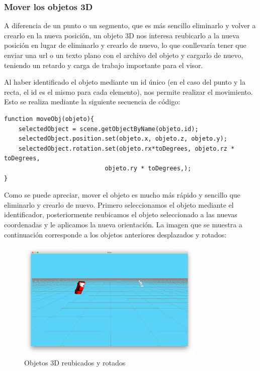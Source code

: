 \subsubsection{Mover los objetos 3D}
A diferencia de un punto o un segmento, que es más sencillo eliminarlo y volver a crearlo en la nueva posición, un objeto 3D nos interesa reubicarlo a la nueva posición en lugar de eliminarlo y crearlo de nuevo, lo que conllevaría tener que enviar una url o un texto plano con el archivo del objeto y cargarlo de nuevo, teniendo un retardo y carga de trabajo importante para el visor.

Al haber identificado el objeto mediante un id único (en el caso del punto y la recta, el id es el mismo para cada elemento), nos permite realizar el movimiento. Esto se realiza mediante la siguiente secuencia de código:
\begin{lstlisting}[frame=single]
function moveObj(objeto){
	selectedObject = scene.getObjectByName(objeto.id);
	selectedObject.position.set(objeto.x, objeto.z, objeto.y);
	selectedObject.rotation.set(objeto.rx*toDegrees, objeto.rz * toDegrees, 
							objeto.ry * toDegrees,);
}
\end{lstlisting}
Como se puede apreciar, mover el objeto es mucho más rápido y sencillo que eliminarlo y crearlo de nuevo. Primero seleccionamos el objeto mediante el identificador, posteriormente reubicamos el objeto seleccionado a las nuevas coordenadas y le aplicamos la nueva orientación. La imagen que se muestra a continuación corresponde a los objetos anteriores desplazados y rotados:
\begin{figure}[H]
  \begin{center}
    \includegraphics[width=0.8\textwidth]{figures/movermodelos.png}
		\caption{Objetos 3D reubicados y rotados}
		\label{fig.movermodelos}
		\end{center}
\end{figure}
